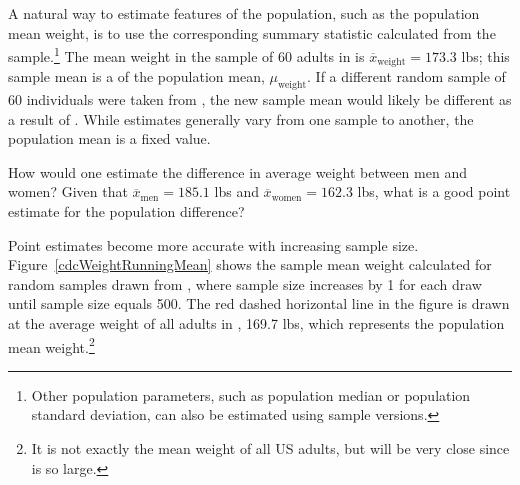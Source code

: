 A natural way to estimate features of the population, such as the population mean weight, is to use the corresponding summary statistic calculated from the sample.\footnote{Other population parameters, such as population median or population standard deviation, can also be estimated using sample versions.} The mean weight in the sample of 60 adults in  is $\overline{x}_{\text{weight}} = 173.3$ lbs; this sample mean is a  of the population mean, $\mu_{\text{weight}}$. If a different random sample of 60 individuals were taken from , the new sample mean would likely be different as a result of . While estimates generally vary from one sample to another, the population mean is a fixed value.  

\begin{exercisewrap}
\begin{nexercise}\label{peOfDiffWeightBetweenGender}%
How would one estimate the difference in average weight between men and women? Given that $\overline{x}_{\text{men}} = 185.1$ lbs and $\overline{x}_{\text{women}} = 162.3$ lbs, what is a good point estimate for the population difference?\footnotemark{}
\end{nexercise}
\end{exercisewrap}

Point estimates become more accurate with increasing sample size. Figure~\ref{cdcWeightRunningMean} shows the sample mean weight calculated for random samples drawn from , where sample size increases by 1 for each draw until sample size equals 500. The red dashed horizontal line in the figure is drawn at the average weight of all adults in , 169.7 lbs, which represents the population mean weight.\footnote{It is not exactly the mean weight of all US adults, but will be very close since  is so large.}

